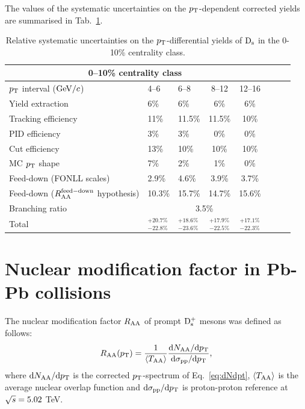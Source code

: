 The values of the systematic uncertainties on the $p_{\rm T}$-dependent corrected yields
are summarised in Tab.~\ref{tab:sysunc_yieldtable}.
\begin{table}[!h]
\centering
\begin{tabular}{|l|l|l|c|c|c|c|c|}
\hline
\multicolumn{5}{|c|}{0--10\% centrality class}       \\                                                                                                                                                                                                                                               \hline
$p_{\rm T}$ interval ($\mathrm{GeV}/c$)        &    4--6          & 6--8      &   8--12            & 12--16                  \\ 
\hline
Yield extraction & 6\% & 6\%& 6\%& 6\%\\
Tracking efficiency & 11\% &11.5\% &11.5\% & 10\% \\
PID efficiency & 3\%& 3\% & 0\%&  0\%\\
Cut efficiency & 13\%& 10\%& 10\%& 10\%\\
MC $p_{\rm T}$ shape & 7\%& 2\%& 1\%& 0\% \\
Feed-down (FONLL scales) & 2.9\% & 4.6\%& 3.9\%& 3.7\%\\
Feed-down ($R_{\rm AA}^{\rm feed-down}$ hypothesis) & 10.3\%& 15.7\%& 14.7\%& 15.6\% \\
\hline
Branching ratio & \multicolumn{4}{c|}{3.5\%}  \\
\hline
\hline
Total & $^{+20.7\%}_{-22.8\%}$& $^{+18.6\%}_{-23.6\%}$ & $^{+17.9\%}_{-22.5\%}$ & $^{+17.1\%}_{-22.3\%}$  \\
\hline
\end{tabular}
\caption{Relative systematic uncertainties on the $p_{\rm T}$-differential yields of ${\rm D_s}$ in the 0-10\% centrality class.}
\label{tab:sysunc_yieldtable}
\end{table}

\section{Nuclear modification factor in Pb-Pb collisions}
\label{sec:RAA}
The nuclear modification factor $R_{\rm AA}$ of prompt ${\rm D_s^+}$ mesons was defined as follows:
\begin{equation}
\label{eq:RAADs}
R_{\rm AA} (p_{\rm T}) = \frac{1}{\langle T_{\rm AA} \rangle} \frac{{\rm d} N_{\rm AA}/{\rm d}p_{\rm T}}{{\rm d} \sigma_{\rm pp}/{\rm d} p_{\rm T}},
\end{equation}
where ${\rm d} N_{\rm AA}/{\rm d}p_{\rm T}$ is the corrected $p_{\rm T}$-spectrum of 
Eq.~\ref{eq:dNdpt}, $\langle T_{\rm AA} \rangle$ is the 
average nuclear overlap function and ${\rm d} \sigma_{\rm pp}/{\rm d} p_{\rm T}$ is 
proton-proton reference at $\sqrt{s} = 5.02$ TeV.
